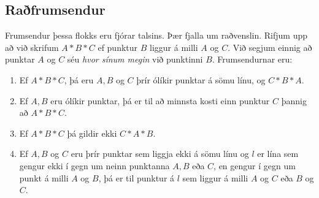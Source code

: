 \subsection{Raðfrumsendur}

Frumsendur þessa flokks eru fjórar talsins. Þær fjalla um raðvenslin. Rifjum upp að við skrifum $A*B*C$ ef punktur $B$ liggur á milli $A$ og $C$. Við segjum einnig að punktar $A$ og $C$ séu \emph{hvor sínum megin} við punktinni $B$. Frumsendurnar eru:

\begin{enumerate}
	\item Ef $A*B*C$, þá eru $A,B$ og $C$ þrír ólíkir punktar á sömu línu, og $C*B*A$.

	\item Ef $A, B$ eru ólíkir punktar, þá er til að minnsta kosti einn punktur $C$ þannig að $A*B*C$.

	\item Ef $A*B*C$ þá gildir ekki $C*A*B$.

	\item Ef $A,B$ og $C$ eru þrír punktar sem liggja ekki á sömu línu og $l$ er lína sem gengur ekki í gegn um neinn punktanna $A, B$ eða $C$, en gengur í gegn um punkt á milli $A$ og $B$, þá er til punktur á $l$ sem liggur á milli $A$ og $C$ eða $B$ og $C$.
\end{enumerate}
